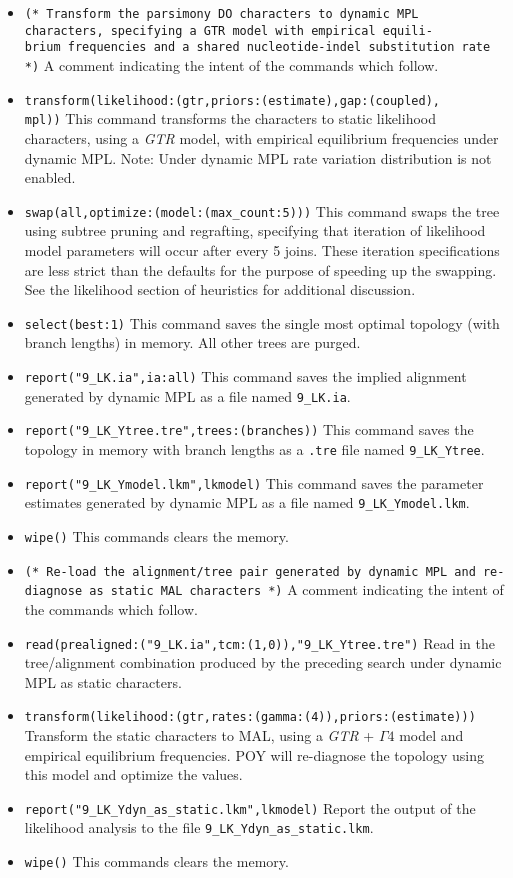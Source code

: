 \begin{itemize}
\item \texttt {(* Transform the parsimony DO characters to dynamic MPL \\characters, specifying a GTR model 
with empirical equili- \\ brium frequencies and a shared nucleotide-indel substitution rate *)} A comment indicating 
the intent of the commands which follow.
\item \texttt{transform(likelihood:(gtr,priors:(estimate),gap:(coupled),\\mpl))} This command transforms the 
characters to static likelihood characters, using a \emph{GTR} model, with empirical equilibrium frequencies under 
dynamic MPL. Note: Under dynamic MPL rate variation distribution is not enabled.
\item \texttt{swap(all,optimize:(model:(max\_count:5)))} This command swaps the tree using subtree pruning and 
regrafting, specifying that iteration of likelihood model parameters will occur after every 5 joins. These iteration 
specifications are less strict than the defaults for the purpose of speeding up the swapping. See the likelihood section
of heuristics for additional discussion. 
\item \texttt{select(best:1)} This command saves the single most optimal topology (with branch lengths) in 
memory. All other trees are purged.
\item \texttt{report("9\_LK.ia",ia:all)} This command saves the implied
    alignment generated by dynamic MPL as a file named \texttt{9\_LK.ia}.
\item \texttt{report("9\_LK\_Ytree.tre",trees:(branches))} This command saves the topology in memory with 
branch lengths as a \texttt{.tre} file named \texttt{9\_LK\_Ytree}.
\item \texttt{report("9\_LK\_Ymodel.lkm",lkmodel)} This command saves the parameter estimates generated 
by dynamic MPL as a file named \texttt{9\_LK\_Ymodel.lkm}.
\item \texttt{wipe()} This commands clears the memory.

\item \texttt{(* Re-load the alignment/tree pair generated by dynamic MPL and
   re-diagnose as static MAL characters *)} A comment indicating the intent of the commands 
which follow.
\item \texttt{read(prealigned:("9\_LK.ia",tcm:(1,0)),"9\_LK\_Ytree.tre")} Read in the tree/alignment 
combination produced by the preceding search under dynamic MPL as static characters.
\item \texttt{transform(likelihood:(gtr,rates:(gamma:(4)),priors:(estimate)))} Transform the static characters to MAL, 
using a \emph{GTR} + $\Gamma 4$ model and empirical equilibrium frequencies. POY will re-diagnose the topology 
using this model and optimize the values.
\item \texttt{report("9\_LK\_Ydyn\_as\_static.lkm",lkmodel)} Report the output of the likelihood analysis to
 the file \texttt{9\_LK\_Ydyn\_as\_static.lkm}.
\item \texttt{wipe()} This commands clears the memory.


\end{itemize}
